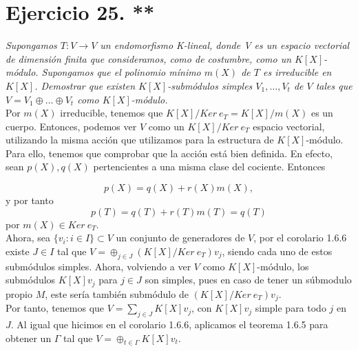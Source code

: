 \section{Ejercicio 25. **}
\textit{Supongamos \(T:V \rightarrow V\) un endomorfismo K-lineal, donde V es un espacio vectorial de dimensión finita que consideramos, como de costumbre, como un \(K[X]\)-módulo. Supongamos que el polinomio mínimo  \(m(X)\) de  \(T\) es irreducible en  \(K[X]\). Demostrar que existen  \(K[X]\)-submódulos simples \(V_1, \dots, V_t\) de \(V\) tales que  \(V = V_1 \oplus \dots \oplus V_t\) como \(K[X]\)-módulo.} \\

Por \(m(X)\) irreducible, tenemos que \(K[X]/Ker\ e_T = K[X]/m(X)\) es un cuerpo. Entonces, podemos ver \(V\) como un \(K[X]/Ker\ e_T\) espacio vectorial, utilizando la misma acción que utilizamos para la estructura de \(K[X]\)-módulo. Para ello, tenemos que comprobar que la acción está bien definida. En efecto, sean \(p(X), q(X)\) pertencientes a una misma clase del cociente. Entonces

\[
p(X) = q(X) + r(X)m(X)
,\]
y por tanto
\[
p(T) = q(T) + r(T)m(T) = q(T)
\]
por \(m(X) \in Ker\ e_T\).\\

Ahora, sea \(\{v_i : i \in I\} \subset V\) un conjunto de generadores de \(V\), por el corolario 1.6.6 existe \(J \in I\) tal que \(V = \oplus_{j \in J} (K[X]/Ker\ e_T)v_j\), siendo cada uno de estos submódulos simples. Ahora, volviendo a ver \(V\) como  \(K[X]\)-módulo, los submódulos \(K[X]v_j\) para \(j \in J\) son simples, pues en caso de tener un súbmodulo propio \(M\), este sería también submódulo de \((K[X]/Ker\ e_T)v_j\).\\

Por tanto, tenemos que \(V = \sum_{j \in J} K[X]v_j\), con \(K[X] v_j\) simple para todo \(j\) en  \(J\). Al igual que hicimos en el corolario 1.6.6, aplicamos el teorema 1.6.5 para obtener un \(\Gamma\) tal que  \(V = \oplus_{t \in \Gamma}K[X]v_t\).

